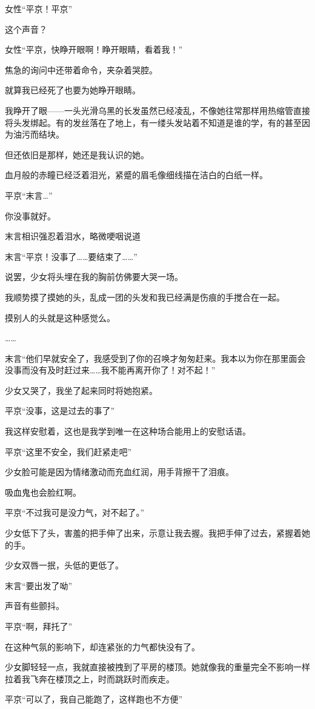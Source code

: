 女性“平京！平京”

这个声音？

女性“平京，快睁开眼啊！睁开眼睛，看着我！”

焦急的询问中还带着命令，夹杂着哭腔。

就算我已经死了也要为她睁开眼睛。

我睁开了眼——一头光滑乌黑的长发虽然已经凌乱，不像她往常那样用热缩管直接将头发绑起。有的发丝落在了地上，有一缕头发站着不知道是谁的学，有的甚至因为油污而结块。

但还依旧是那样，她还是我认识的她。

血月般的赤瞳已经泛着泪光，紧蹙的眉毛像细线描在洁白的白纸一样。

平京“末言…”

你没事就好。

末言相识强忍着泪水，略微哽咽说道

末言“平京！没事了……要结束了……”

说罢，少女将头埋在我的胸前仿佛要大哭一场。

我顺势摸了摸她的头，乱成一团的头发和我已经满是伤痕的手搅合在一起。

摸别人的头就是这种感觉么。

……

末言“他们早就安全了，我感受到了你的召唤才匆匆赶来。我本以为你在那里面会没事而没有及时赶过来……我不能再离开你了！对不起！”

少女又哭了，我坐了起来同时将她抱紧。

平京“没事，这是过去的事了”

我这样安慰着，这也是我学到唯一在这种场合能用上的安慰话语。

平京“这里不安全，我们赶紧走吧”

少女脸可能是因为情绪激动而充血红润，用手背擦干了泪痕。

吸血鬼也会脸红啊。

平京“不过我可是没力气，对不起了。”

少女低下了头，害羞的把手伸了出来，示意让我去握。我把手伸了过去，紧握着她的手。

少女双唇一抿，头低的更低了。

末言“要出发了呦”

声音有些颤抖。

平京“啊，拜托了”

在这种气氛的影响下，却连紧张的力气都快没有了。

少女脚轻轻一点，我就直接被拽到了平房的楼顶。她就像我的重量完全不影响一样拉着我飞奔在楼顶之上，时而跳跃时而疾走。

平京“可以了，我自己能跑了，这样跑也不方便”

